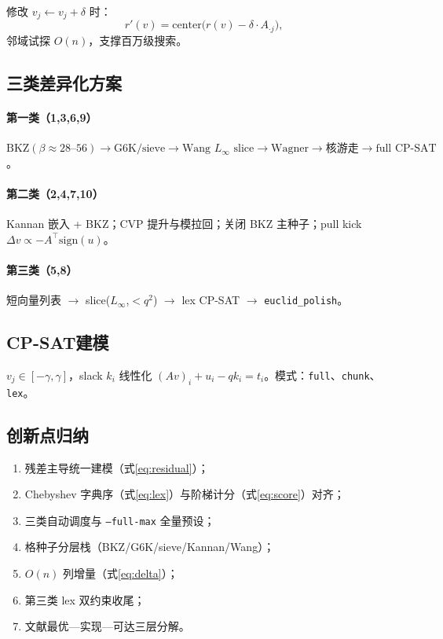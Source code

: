 \documentclass[12pt,a4paper]{ctexart}
\begin{document}
修改 $v_j\leftarrow v_j+\delta$ 时：
\begin{equation}\label{eq:delta}
  r'(v)=\mathrm{center}\bigl(r(v)-\delta\cdot A_{\cdot j}\bigr),
\end{equation}
邻域试探 $O(n)$，支撑百万级搜索。

\subsection{三类差异化方案}

\paragraph{第一类（1,3,6,9）}
$\text{BKZ}(\beta{\approx}28\text{--}56)\to\text{G6K/sieve}\to\text{Wang }L_{\infty}\text{ slice}\to\text{Wagner}\to\text{核游走}\to\text{full CP-SAT}$。

\paragraph{第二类（2,4,7,10）}
Kannan 嵌入 + BKZ；CVP 提升与模拉回；关闭 BKZ 主种子；pull kick $\Delta v\propto -A^\top\mathrm{sign}(u)$。

\paragraph{第三类（5,8）}
短向量列表 $\to$ slice($L_{\infty}$,$<q^2$) $\to$ lex CP-SAT $\to$ \texttt{euclid\_polish}。

\subsection{CP-SAT建模}

$v_j\in[-\gamma,\gamma]$，slack $k_i$ 线性化 $(Av)_i+u_i-qk_i=t_i$。模式：\texttt{full}、\texttt{chunk}、\texttt{lex}。

\subsection{创新点归纳}

\begin{enumerate}[leftmargin=2em]
  \item 残差主导统一建模（式\eqref{eq:residual}）；
  \item Chebyshev 字典序（式\eqref{eq:lex}）与阶梯计分（式\eqref{eq:score}）对齐；
  \item 三类自动调度与 \texttt{--full-max} 全量预设；
  \item 格种子分层栈（BKZ/G6K/sieve/Kannan/Wang）；
  \item $O(n)$ 列增量（式\eqref{eq:delta}）；
  \item 第三类 lex 双约束收尾；
  \item 文献最优—实现—可达三层分解。
\end{enumerate}
\end{document}

